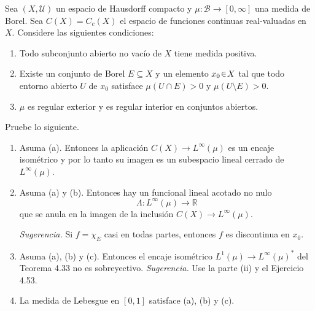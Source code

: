 \setcounter{neje}{56}
\begin{nejer}
Sea $(X, \mathcal{U})$ un espacio de Hausdorff compacto y $\mu \colon \mathcal{B} \to [0, \infty]$ una medida de Borel. Sea $C(X) = C_c(X)$ el espacio de funciones continuas real-valuadas en $X$. Considere las siguientes condiciones:
\begin{enumerate}[label = (\alph*), leftmargin=1.8em]
    \item Todo subconjunto abierto no vacío de $X$ tiene medida positiva.
    \item Existe un conjunto de Borel $E \subseteq X$ y un elemento $x_0 \en X$ tal que todo entorno abierto $U$ de $x_0$ satisface $\mu(U \cap E) > 0$ y $\mu(U \setminus E) > 0$.
    \item $\mu$ es regular exterior y es regular interior en conjuntos abiertos.
\end{enumerate}
Pruebe lo siguiente.
\begin{enumerate}[label = (\roman*), leftmargin=1.8em]
    \item Asuma (a). Entonces la aplicación $C(X) \to L^\infty(\mu)$ es un encaje isométrico y por lo tanto su imagen es un subespacio lineal cerrado de $L^\infty(\mu)$.
    \item Asuma (a) y (b). Entonces hay un funcional lineal acotado no nulo
    $$
    \Lambda \colon L^\infty(\mu) \to \mathbb{R}
    $$
    que se anula en la imagen de la inclusión $C(X) \to L^\infty(\mu)$.\par 
    \emph{Sugerencia.} Si $f = \chi_E$ casi en todas partes, entonces $f$ es discontinua en $x_0$.
    \item Asuma (a), (b) y (c). Entonces el encaje isométrico $L^1(\mu) \to L^\infty(\mu)^*$ del Teorema 4.33 no es sobreyectivo. \emph{Sugerencia.} Use la parte (ii) y el Ejercicio 4.53.
    \item La medida de Lebesgue en $[0,1]$ satisface (a), (b) y (c).
\end{enumerate}
\end{nejer}

